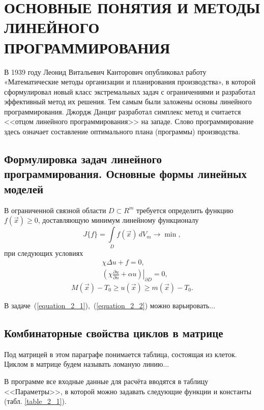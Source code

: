 \section{ОСНОВНЫЕ ПОНЯТИЯ И МЕТОДЫ ЛИНЕЙНОГО ПРОГРАММИРОВАНИЯ}

В 1939 году Леонид Витальевич Канторович опубликовал работу «Математические методы организации и планирования производства», в которой сформулировал новый класс экстремальных задач с ограничениями и разработал эффективный метод их решения. Тем самым были заложены основы линейного программирования. Джордж Данциг разработал симплекс метод и считается <<отцом линейного программирования>> на западе. Слово программирование здесь означает составление оптимального плана (программы) производства.

\subsection{Формулировка задач линейного программирования. Основные формы линейных моделей }

В ограниченной связной области $D{\subset}R^m$ требуется определить функцию $f(\vec x)\! \geqslant\! 0$, доставляющую минимум линейному функционалу
\begin{equation}
\label{equation_2_1}
	J\{f\} = \int\limits_D f(\vec x)\,dV_m \to \min,
\end{equation}
при следующих условиях
\begin{equation}
\label{equation_2_2}
	\begin{split}
		&\chi\Delta u + f = 0,\\
		&\left.\left(\chi\frac{\partial u}{\partial n} + \alpha u\right)\right|_{{\partial}D} = 0,
	\end{split}
\end{equation}
\begin{equation}
\label{equation_2_3}
	M(\vec x) - T_0 \geqslant u(\vec x) \geqslant m(\vec x) - T_0.
\end{equation}

В задаче~(\ref{equation_2_1}),~(\ref{equation_2_2}) можно варьировать...


\subsection{Комбинаторные свойства циклов в матрице}
Под матрицей в этом параграфе понимается таблица, состоящая из клеток. Циклом в матрице будем называть ломаную линию...


В программе все входные данные для расчёта вводятся в таблицу <<Параметры>>, в которой можно задавать следующие функции и константы (табл. \ref{table_2_1}).


